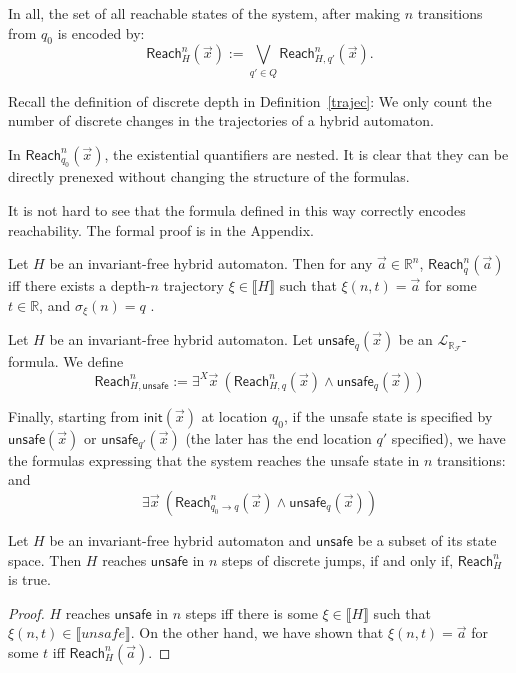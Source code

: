 \documentclass[envcountsect]{llncs}
\newcommand{\init}{\mathsf{init}}
\newcommand{\reach}{\mathsf{Reach}}
\newcommand{\unsafe}{\mathsf{unsafe}}
\newcommand{\lrf}{\mathcal{L}_{\mathbb{R}_{\mathcal{F}}}}
\begin{document}
In all, the set of all reachable states of the system, after making $n$
transitions from $q_0$ is encoded by:
$$\reach^n_{H}(\vec x) := \bigvee_{q'\in Q} \reach^n_{H,q'}(\vec x).$$
\begin{remark}
Recall the definition of discrete depth in Definition~\ref{trajec}: We only
count the number of discrete changes in the trajectories of a hybrid automaton.
\end{remark}
\begin{remark}
In $\reach_{q_0}^n(\vec x)$, the existential quantifiers are nested. It is
clear that they can be directly prenexed without changing the structure of the
formulas.
\end{remark}
It is not hard to see that the formula defined in this way correctly encodes
reachability. The formal proof is in the Appendix.
\begin{proposition}
Let $H$ be an invariant-free hybrid automaton. Then for any $\vec a\in
\mathbb{R}^n$, $\reach^n_q(\vec a)$ iff there exists a depth-$n$ trajectory
$\xi\in\llbracket H\rrbracket$ such that $\xi(n, t) = \vec a$ for some
$t\in\mathbb{R}$, and $\sigma_{\xi}(n) = q$ .
\end{proposition}

\begin{definition}[$\reach^n_{H,\unsafe}$] Let $H$ be an invariant-free hybrid
automaton. Let $\unsafe_q(\vec x)$ be an $\lrf$-formula. We define
$$\reach^n_{H,\unsafe}:= \exists^X \vec x \ (\reach^n_{H,q}(\vec x)\wedge
\unsafe_q(\vec x))$$
\end{definition}

Finally, starting from $\init(\vec x)$ at location $q_0$, if the unsafe state
is specified by $\unsafe(\vec x)$ or $\unsafe_{q'}(\vec x)$ (the later has the
end location $q'$ specified), we have the formulas expressing that the system
reaches the unsafe state in $n$ transitions:
and
$$\exists \vec x\ (\reach^n_{q_0\rightarrow q}(\vec x)\wedge \unsafe_q(\vec x))$$

\begin{corollary}
Let $H$ be an invariant-free hybrid automaton and $\unsafe$ be a subset of its
state space. Then $H$ reaches $\unsafe$ in $n$ steps of discrete jumps, if and
only if, $\reach^n_{H}$ is true.
\end{corollary}

\begin{proof}
$H$ reaches $\unsafe$ in $n$ steps iff there is some $\xi\in \llbracket
H\rrbracket$ such that $\xi(n, t)\in \llbracket unsafe\rrbracket$. On the other
hand, we have shown that $\xi(n, t) = \vec a$ for some $t$ iff $\reach_H^n(\vec
a)$.
\end{proof}
\end{document}
